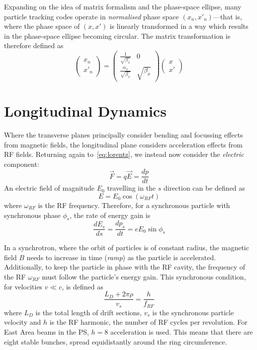 \documentclass[a4paper,twoside,11pt]{report}
\begin{document}
Expanding on the idea of matrix formalism and the phase-space ellipse, many particle tracking codes operate in \textit{normalised} phase space $(x_n, x'_n)$---that is, where the phase space of $(x, x')$ is linearly transformed in a way which results in the phase-space ellipse becoming circular. The matrix transformation is therefore defined as
\begin{equation}
  \begin{pmatrix}
    x_n \\
    x'_n
  \end{pmatrix} = 
  \begin{pmatrix}
    \frac{1}{\sqrt{\beta_x}} & 0 \\
    \frac{\alpha_x}{\sqrt{\beta_x}} & \sqrt{\beta_x}
  \end{pmatrix} \begin{pmatrix}
    x \\
    x'
  \end{pmatrix}
  \label{eq:normalised}
\end{equation}

\section{Longitudinal Dynamics}\label{sec:long}

Where the transverse planes principally consider bending and focussing effects from magnetic fields, the longitudinal plane considers acceleration effects from RF fields. Returning again to~\autoref{eq:lorentz}, we instead now consider the \textit{electric} component:
\begin{equation}
  \vec F = q\vec E = \frac{dp}{dt}
\end{equation} 
An electric field of magnitude $E_0$ travelling in the $s$ direction can be defined as
\begin{equation}
  E = E_0\cos(\omega_{RF}t)
\end{equation} where $\omega_{RF}$ is the RF frequency. Therefore, for a synchronous particle with synchronous phase $\phi_s$, the rate of energy gain is
\begin{equation}
  \frac{dE_s}{ds}=\frac{dp_s}{dt}=eE_0\sin\phi_s
\end{equation}

In a synchrotron, where the orbit of particles is of constant radius, the magnetic field $B$ needs to increase in time (\textit{ramp}) as the particle is accelerated. Additionally, to keep the particle in phase with the RF cavity, the frequency of the RF $\omega_{RF}$ must follow the particle's energy gain. This synchronous condition, for velocities $v\ll c$, is defined as~\cite{Tecker:2674860}
\begin{equation}
  \frac{L_D+2\pi\rho}{v_s}=\frac h{f_{RF}}
\end{equation} where $L_D$ is the total length of drift sections, $v_s$ is the synchronous particle velocity and $h$ is the RF harmonic, the number of RF cycles per revolution. For East Area beams in the PS, $h=8$ acceleration is used. This means that there are eight stable bunches, spread equidistantly around the ring circumference. 
\end{document}

